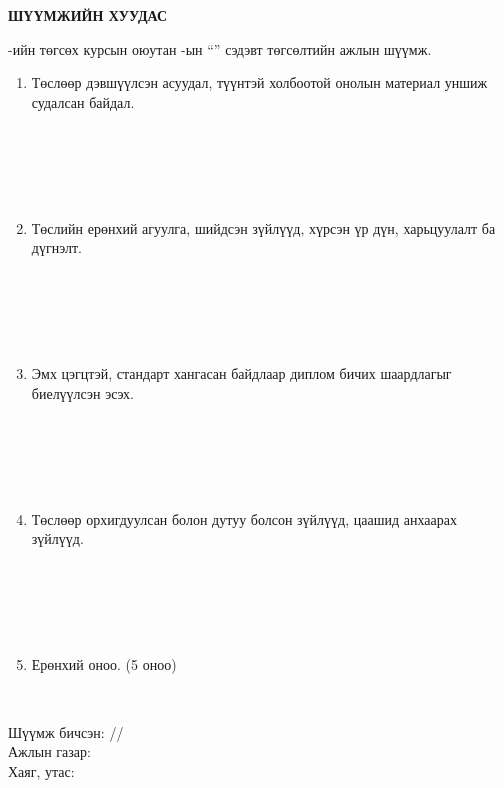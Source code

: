 \begin{titlepage}
    \begin{center}
        {\scshape\Large \univname\par}
        {\scshape\large \facname\par}\vspace{1cm}
        \textbf{\Large ШҮҮМЖИЙН ХУУДАС}\\[1cm]
    \end{center}

    \normalsize
    \deptname-ийн төгсөх курсын оюутан \shortname-ын ``\ttitle'' сэдэвт төгсөлтийн ажлын шүүмж.

    \begin{enumerate}
        \item Төслөөр дэвшүүлсэн асуудал, түүнтэй холбоотой онолын материал уншиж судалсан байдал.
        \begin{center}
            \dotfill \\[0.1cm]\dotfill \\[0.1cm]\dotfill \\[0.1cm]\dotfill \\[0.4cm]
        \end{center}
        \item Төслийн ерөнхий агуулга, шийдсэн зүйлүүд, хүрсэн үр дүн, харьцуулалт ба дүгнэлт.
        \begin{center}
            \dotfill \\[0.1cm]\dotfill \\[0.1cm]\dotfill \\[0.1cm]\dotfill \\[0.4cm]
        \end{center}
        \item Эмх цэгцтэй, стандарт хангасан байдлаар диплом бичих шаардлагыг биелүүлсэн эсэх.
        \begin{center}
            \dotfill \\[0.1cm]\dotfill \\[0.1cm]\dotfill \\[0.1cm]\dotfill \\[0.4cm]
        \end{center}
        \item Төслөөр орхигдуулсан болон дутуу болсон зүйлүүд, цаашид анхаарах зүйлүүд.
        \begin{center}
            \dotfill \\[0.1cm]\dotfill \\[0.1cm]\dotfill \\[0.1cm]\dotfill \\[0.4cm]
        \end{center}
        \item Ерөнхий оноо. (5 оноо)
        \begin{center}
            \dotfill \\[0.8cm]
        \end{center}
    \end{enumerate}
    Шүүмж бичсэн: \makebox[3cm]{\dotfill} /\readname/ \\[0.5cm]
    Ажлын газар: \dotfill \\[0.5cm]
    Хаяг, утас: \makebox[5cm]{\dotfill}
\end{titlepage}
